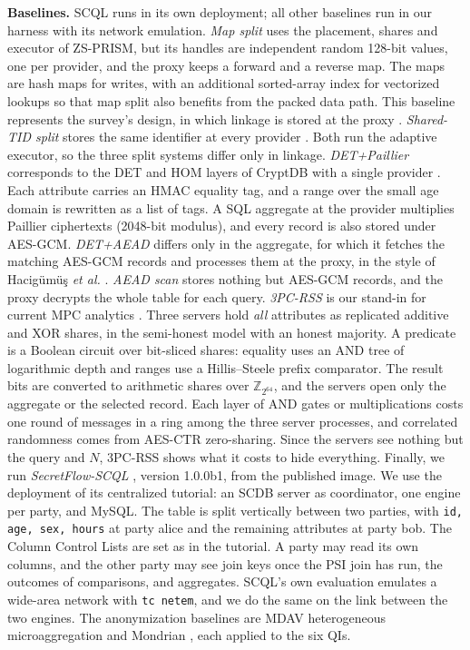 \documentclass[conference]{IEEEtran}
\newcommand{\sys}{ZS-PRISM}
\begin{document}
\textbf{Baselines.} SCQL runs in its own deployment; all other baselines run in our harness with its network emulation. \emph{Map split} uses the placement, shares and executor of \sys{}, but its handles are independent random 128-bit values, one per provider, and the proxy keeps a forward and a reverse map. The maps are hash maps for writes, with an additional sorted-array index for vectorized lookups so that map split also benefits from the packed data path. This baseline represents the survey's design, in which linkage is stored at the proxy \cite{domingo2019survey}. \emph{Shared-TID split} stores the same identifier at every provider \cite{aggarwal2005two}. Both run the adaptive executor, so the three split systems differ only in linkage. \emph{DET+Paillier} corresponds to the DET and HOM layers of CryptDB with a single provider \cite{popa2011cryptdb}. Each attribute carries an HMAC equality tag, and a range over the small age domain is rewritten as a list of tags. A SQL aggregate at the provider multiplies Paillier ciphertexts (2048-bit modulus), and every record is also stored under AES-GCM. \emph{DET+AEAD} differs only in the aggregate, for which it fetches the matching AES-GCM records and processes them at the proxy, in the style of Hacig\"um\"u\c{s} \emph{et al.} \cite{hacigumus2002executing}. \emph{AEAD scan} stores nothing but AES-GCM records, and the proxy decrypts the whole table for each query. \emph{3PC-RSS} is our stand-in for current MPC analytics \cite{bogdanov2008sharemind,liagouris2023secrecy,poddar2021senate}. Three servers hold \emph{all} attributes as replicated additive and XOR shares, in the semi-honest model with an honest majority. A predicate is a Boolean circuit over bit-sliced shares: equality uses an AND tree of logarithmic depth and ranges use a Hillis--Steele prefix comparator. The result bits are converted to arithmetic shares over $\mathbb{Z}_{2^{64}}$, and the servers open only the aggregate or the selected record. Each layer of AND gates or multiplications costs one round of messages in a ring among the three server processes, and correlated randomness comes from AES-CTR zero-sharing. Since the servers see nothing but the query and $N$, 3PC-RSS shows what it costs to hide everything. Finally, we run \emph{SecretFlow-SCQL} \cite{fang2024scql}, version 1.0.0b1, from the published image. We use the deployment of its centralized tutorial: an SCDB server as coordinator, one engine per party, and MySQL. The table is split vertically between two parties, with \texttt{id, age, sex, hours} at party alice and the remaining attributes at party bob. The Column Control Lists are set as in the tutorial. A party may read its own columns, and the other party may see join keys once the PSI join has run, the outcomes of comparisons, and aggregates. SCQL's own evaluation emulates a wide-area network with \texttt{tc netem}, and we do the same on the link between the two engines. The anonymization baselines are MDAV heterogeneous microaggregation \cite{domingo2005ordinal} and Mondrian \cite{lefevre2006mondrian}, each applied to the six QIs.
\end{document}
